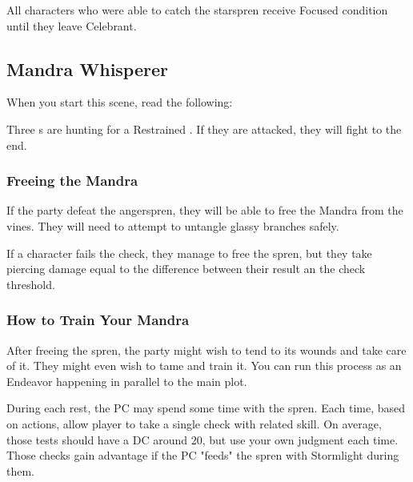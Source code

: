 All characters who were able to catch the starspren receive Focused condition until they leave Celebrant.




\subsection{Mandra Whisperer}
\label{ssec:celebrantLuckspren}

When you start this scene, read the following:


Three \enemyAngerSpren{}s are hunting for a Restrained \enemyLuckspren{}. If they are attacked, they will fight to the end. 

\subsubsection{Freeing the Mandra}

If the party defeat the angerspren, they will be able to free the Mandra from the vines. They will need to attempt  to untangle glassy branches safely. 

If a character fails the check, they manage to free the spren, but they take piercing damage equal to the difference between their result an the check threshold.

\subsubsection{How to Train Your Mandra}
\label{ssec:celebrantLucksprenTame}

After freeing the spren, the party might wish to tend to its wounds and take care of it. They might even wish to tame and train it. You can run this process as an Endeavor happening in parallel to the main plot.

During each rest, the PC may spend some time with the spren. Each time, based on actions, allow player to take a single check with related skill. On average, those tests should have a DC around 20, but use your own judgment each time. Those checks gain advantage if the PC "feeds" the spren with Stormlight during them.


